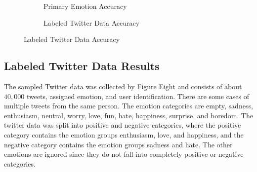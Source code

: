 \documentclass[titlepage,letterpaper]{article}
\begin{document}

		
\begin{figure}[]
	\hfill
	\vspace*{-1in}
	\centering
	\begin{adjustwidth}{-.75in}{-.75in}
		
 \begin{subfigure}{3in}
 	\centering
 	\caption{Primary Emotion Accuracy}
	\resizebox{3in}{!}{}
	\label{primemresult}
\end{subfigure}
\hfill
\begin{subfigure}{3in}
	\centering
	\caption{Labeled Twitter Data Accuracy}
	\resizebox{3in}{!}{}
	\label{lbtwitresult}
\end{subfigure}
\hfill
\end{adjustwidth}
\end{figure}
\subsection{Labeled Twitter Data Results}

The sampled Twitter data was collected by Figure Eight \cite{LabeledTwitter} and consists of about $40,000$ tweets, assigned emotion, and user identification. There are some cases of multiple tweets from the same person. The emotion categories are empty, sadness, enthusiasm, neutral, worry, love, fun, hate, happiness, surprise, and boredom. The twitter data was split into positive and negative categories, where the positive category contains the emotion groups enthusiasm, love, and happiness, and the negative category contains the emotion groups sadness and hate. The other emotions are ignored since they do not fall into completely positive or negative categories. 
\end{document}
